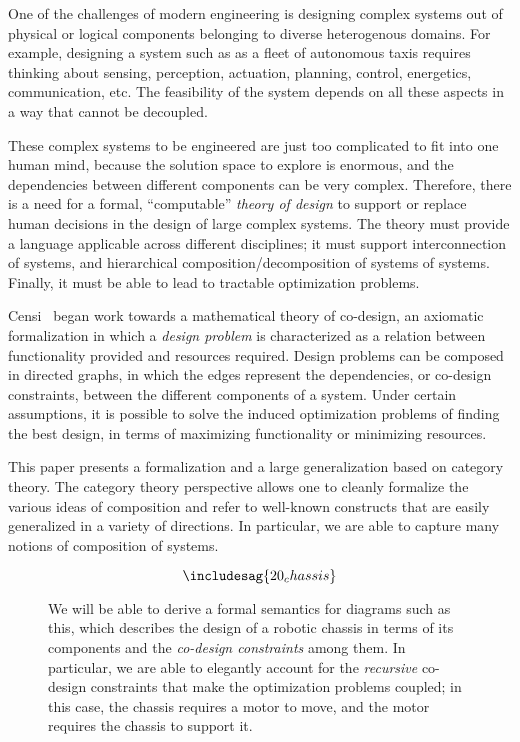 One of the challenges of modern engineering is designing complex systems out
of physical or logical components belonging to diverse heterogenous domains.
For example, designing a system such as as a fleet of autonomous taxis
requires thinking about sensing, perception, actuation, planning, control,
energetics, communication, etc. The feasibility of the system depends on all
these aspects in a way that cannot be decoupled.

These complex systems to be engineered are just too complicated to
fit into one human mind, because the solution space to explore is enormous,
and the dependencies between different components can be very complex.
Therefore, there is a need for a formal, ``computable'' \emph{theory of design} to
support or replace human decisions in the design of large complex systems.
The theory must provide a language applicable across different disciplines;
it must support interconnection of systems, and hierarchical composition/decomposition of systems of systems. Finally,
it must be able to lead to tractable optimization problems.

Censi~\cite{Censi2017} began work towards a mathematical theory of co-design,
an axiomatic formalization in which a \emph{design problem} is characterized
as a relation between functionality provided and resources required. Design
problems can be composed in directed graphs, in which the edges represent
the dependencies, or co-design constraints, between the different components
of a system. Under certain assumptions, it is possible to solve the induced
optimization problems of finding the best design, in terms of maximizing
functionality or minimizing resources.

This paper presents a formalization and a large generalization based on
category theory. The category theory perspective allows one to cleanly
formalize the various ideas of composition and refer to well-known
constructs that are easily generalized in a variety of directions. In particular, we are able to capture many notions of composition
of systems.


\begin{figure}[h!]
    \begin{equation}
        \label{eqn:chassis}
        \includesag{20_chassis}
    \end{equation}
    \caption{
        We will be able to derive a formal semantics for
        diagrams such as this, which describes the design of a robotic
        chassis in terms of its components and the \emph{co-design constraints} among
        them. In particular, we are able to elegantly account for the
        \emph{recursive} co-design constraints that make the optimization problems
        coupled; in this case, the chassis requires a motor to move, and the motor
        requires the chassis to support it.
    }
\end{figure}


